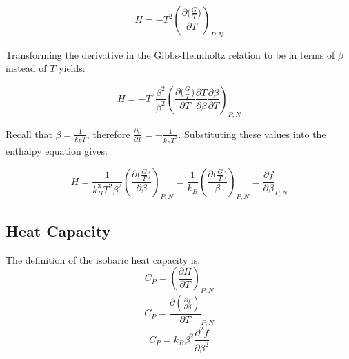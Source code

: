 \documentclass[aps,pre,twocolumn,nofootinbib,superscriptaddress,linenumbers,10pt, draft,tightenlines]{revtex4-1}
\begin{document}
\begin{equation}H=-T^2 \left(\frac{\partial \big(\frac{G}{T}\big)}{\partial T}\right)_{P,N}\end{equation}

Transforming the derivative in the Gibbs-Helmholtz relation to be in terms of $\beta$ instead of $T$ yields:

\begin{equation}H=-T^2  \frac{\beta^2}{\beta^2}\left(\frac{\partial \big(\frac{G}{T}\big)}{\partial T} \frac{\partial T}{\partial \beta} \frac{\partial \beta}{\partial T}\right)_{P,N}\end{equation}


Recall that $\beta = \frac{1}{k_B T}$, therefore $\frac{\partial \beta}{\partial T} = - \frac{1}{k_B T^2}$. Substituting these values into the enthalpy equation gives:

\begin{equation}H = \frac{1}{k_B^3 T^2 \beta^2} \left(\frac{\partial \big(\frac{G}{T}\big)}{\partial \beta}\right)_{P,N} = \frac{1}{k_B} \left(\frac{\partial \big(\frac{G}{T}\big)}{\beta}\right)_{P,N} = \frac{\partial f}{\partial \beta}_{P,N} \end{equation}


\subsection{Heat Capacity}
The definition of the isobaric heat capacity is:
\begin{equation}C_P = \left( \frac{\partial H}{\partial T}\right)_{P,N}\end{equation}
\begin{equation}C_P =  \frac{\partial \left(\frac{\partial f}{\partial \beta}\right)}{\partial T}_{P,N}\end{equation}
\begin{equation}C_P = k_B \beta^2 \frac{\partial^2 f}{\partial \beta^2}\end{equation}
\end{document}
